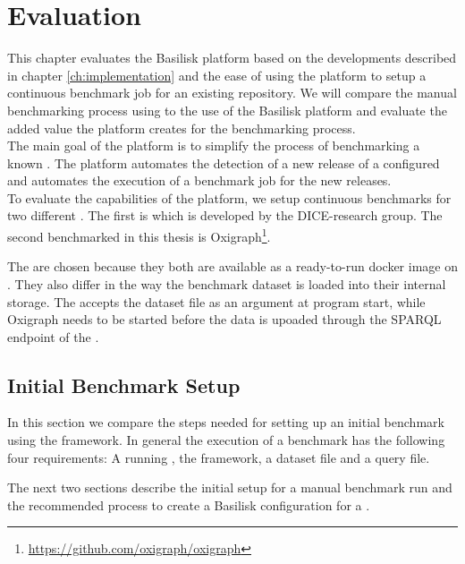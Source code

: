 \chapter{Evaluation}
\label{ch:evaluation}

This chapter evaluates the Basilisk platform based on the developments described in chapter \ref{ch:implementation} and the ease of using the platform to setup a continuous benchmark job for an existing repository.
We will compare the manual benchmarking process using \iguana{} to the use of the Basilisk platform and evaluate the added value the platform creates for the benchmarking process.
\\

The main goal of the platform is to simplify the process of benchmarking a known \tsp{}. 
The platform automates the detection of a new release of a configured \ts{} and  automates the execution of a benchmark job for the new releases.
\\

To evaluate the capabilities of the platform, we setup continuous benchmarks for two different \tsp{}.
The first \ts{} is \tentris{}\cite{bigerlTentrisTensorBasedTriple2020} which is developed by the DICE-research group.
The second \ts{} benchmarked in this thesis is Oxigraph\footnote{\url{https://github.com/oxigraph/oxigraph}}.

The \tsp{} are chosen because they both are available as a ready-to-run docker image on \dockh{}.
They also differ in the way the benchmark dataset is loaded into their internal storage.
The \tentris{} \ts{} accepts the dataset file as an argument at program start, while Oxigraph needs to be started before the data is upoaded through the SPARQL endpoint of the \ts{}.


\section{Initial Benchmark Setup}
In this section we compare the steps needed for setting up an initial \ts{} benchmark using the \iguana{} framework.
In general the execution of a benchmark has the following four requirements:
A running \ts{}, the \iguana{} framework, a dataset file and a query file.

The next two sections describe the initial setup for a manual benchmark run and the recommended process to create a Basilisk configuration for a \ts{}.


